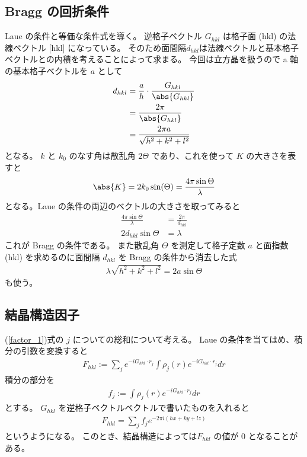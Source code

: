 \documentclass[11pt,dvipdfmx,a4paper]{jsarticle}
\begin{document}
\subsection{Bragg の回折条件}
 Laue の条件と等価な条件式を導く。
逆格子ベクトル \(G_{hkl}\) は格子面 (hkl) の法線ベクトル [hkl] になっている。
そのため面間隔\(d_{hkl}\)は法線ベクトルと基本格子ベクトルとの内積を考えることによって求まる。
今回は立方晶を扱うので a 軸の基本格子ベクトルを \(a\) として
\begin{align}
	d_{hkl} &= \frac{a}{h} \cdot \frac{G_{hkl}}{\abs{G_{hkl}}}\\
	&= \frac{2\pi}{\abs{G_{hkl}}} \label{eq:d-G}\\
	&= \frac{2\pi a}{\sqrt{h^2+k^2+l^2}}
\end{align}
となる。
\(k\) と \(k_0\) のなす角は散乱角 \(2\Theta\) であり、これを使って \(K\) の大きさを表すと
\begin{align}
	\abs{K} = 2k_0\sin(\Theta) = \frac{4\pi\sin\Theta}{\lambda}
\end{align}
となる。Laue の条件の両辺のベクトルの大きさを取ってみると
\begin{align}
	\frac{4\pi\sin\Theta}{\lambda} &= \frac{2\pi}{d_{hkl}}\\
	2d_{hkl} \sin\Theta &= \lambda
\end{align}
これが Bragg の条件である。
また散乱角 \(\Theta\) を測定して格子定数 \(a\) と面指数 (hkl) を求めるのに面間隔 \(d_{hkl}\) を Bragg の条件から消去した式
\begin{align}
	\lambda \sqrt{h^2+k^2+l^2}  = 2a \sin\Theta \label{eq:bragg}
\end{align}
も使う。

\subsection{結晶構造因子}
(\ref{factor_1})式の \(j\) についての総和について考える。
Laue の条件を当てはめ、積分の引数を変換すると
\begin{align}
	F_{hkl} := \sum_j e^{-iG_{hkl}\cdot r_j} \int \rho_j(r) e^{-iG_{hkl}\cdot r_j}dr
\end{align}
積分の部分を
\begin{align}
	f_j :=\int \rho_j(r) e^{-iG_{hkl}\cdot r_j}dr
\end{align}
とする。
\(G_{hkl}\) を逆格子ベクトルベクトルで書いたものを入れると
\begin{align}
	F_{hkl} = \sum_j f_j e^{-2\pi i (hx + ky + lz)}
\end{align}
というようになる。
このとき、結晶構造によっては\(F_{hkl}\) の値が 0 となることがある。
\end{document}

